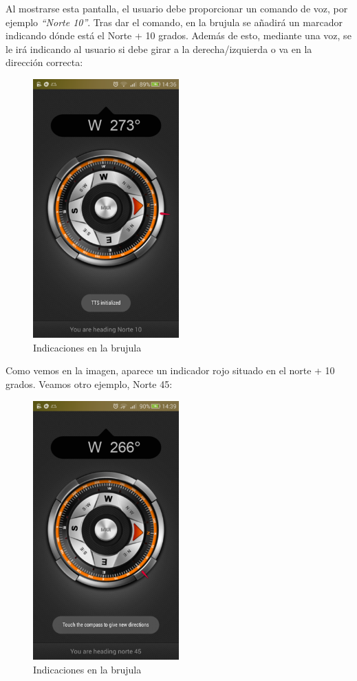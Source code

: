 \documentclass[	DIV=calc,%
							paper=a4,%
							fontsize=11pt]{scrartcl}	 					%
\begin{document}
Al mostrarse esta pantalla, el usuario debe proporcionar un comando de
voz, por ejemplo \emph{``Norte 10''}. Tras dar el comando, en la brujula
se añadirá un marcador indicando dónde está el Norte + 10 grados. Además
de esto, mediante una voz, se le irá indicando al usuario si debe girar
a la derecha/izquierda o va en la dirección correcta:

\begin{figure}[H]
\centering
\includegraphics[width=0.5\textwidth]{./img/norte10.png}
\caption{Indicaciones en la brujula}
\end{figure}

Como vemos en la imagen, aparece un indicador rojo situado en el norte +
10 grados. Veamos otro ejemplo, Norte 45:

\begin{figure}[H]
\centering
\includegraphics[width=0.5\textwidth]{./img/norte45.png}
\caption{Indicaciones en la brujula}
\end{figure}
\end{document}
